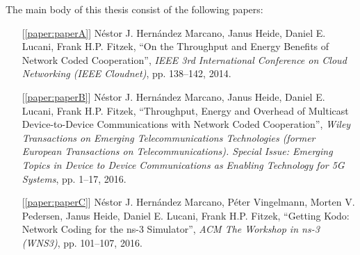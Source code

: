 \noindent The main body of this thesis consist of the following papers:
\begin{itemize}

   \item[{[\ref{paper:paperA}]}] N\'estor J. Hern\'andez Marcano, Janus Heide, Daniel E. Lucani, Frank H.P. Fitzek, ``On the Throughput and Energy Benefits of Network Coded Cooperation'', \emph{IEEE 3rd International Conference on Cloud Networking (IEEE Cloudnet)}, pp. 138--142, 2014.

  \item[{[\ref{paper:paperB}]}] N\'estor J. Hern\'andez Marcano, Janus Heide, Daniel E. Lucani, Frank H.P. Fitzek, ``Throughput, Energy and Overhead of Multicast Device-to-Device Communications with Network Coded Cooperation'', \emph{Wiley Transactions on Emerging Telecommunications Technologies  (former European Transactions on Telecommunications). Special Issue: Emerging Topics in Device to Device Communications as Enabling Technology for 5G Systems}, pp. 1--17, 2016.

  \item[{[\ref{paper:paperC}]}] N\'estor J. Hern\'andez Marcano, P\'eter Vingelmann, Morten V. Pedersen, Janus Heide, Daniel E. Lucani, Frank H.P. Fitzek, ``Getting Kodo: Network Coding for the ns-3 Simulator'', \emph{ACM The Workshop in ns-3 (WNS3)}, pp. 101--107, 2016.

\end{itemize}


